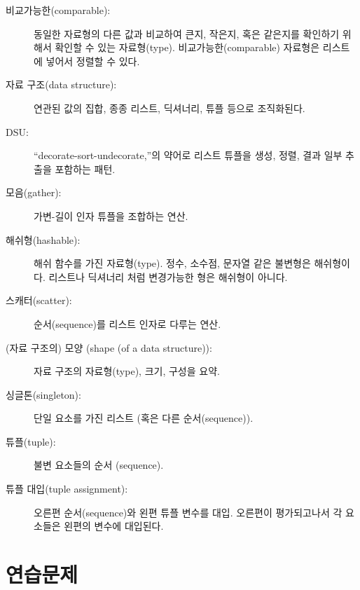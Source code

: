 \begin{description}

\item[비교가능한(comparable):] 동일한 자료형의 다른 값과 비교하여 큰지, 작은지, 혹은 같은지를 확인하기 위해서 확인할 수 있는 자료형(type).
비교가능한(comparable) 자료형은 리스트에 넣어서 정렬할 수 있다.

\item[자료 구조(data structure):] 연관된 값의 집합, 종종 리스트, 딕셔너리, 튜플 등으로 조직화된다.

\item[DSU:] ``decorate-sort-undecorate,''의 약어로 리스트 튜플을 생성, 정렬, 결과 일부 추출을 포함하는 패턴.

\item[모음(gather):] 가변-길이 인자 튜플을 조합하는 연산.

\item[해쉬형(hashable):] 해쉬 함수를 가진 자료형(type). 
정수, 소수점, 문자열 같은 불변형은 해쉬형이다. 
리스트나 딕셔너리 처럼 변경가능한 형은 해쉬형이 아니다.

\item[스캐터(scatter):] 순서(sequence)를 리스트 인자로 다루는 연산.

\item[(자료 구조의) 모양 (shape (of a data structure)):] 자료 구조의 자료형(type), 크기, 구성을 요약.

\item[싱글톤(singleton):] 단일 요소를 가진 리스트 (혹은 다른 순서(sequence)).

\item[튜플(tuple):] 불변 요소들의 순서 (sequence).

\item[튜플 대입(tuple assignment):] 오른편 순서(sequence)와 왼편 튜플 변수를 대입.
오른편이 평가되고나서 각 요소들은 왼편의 변수에 대입된다.

\end{description}


\section{연습문제}

